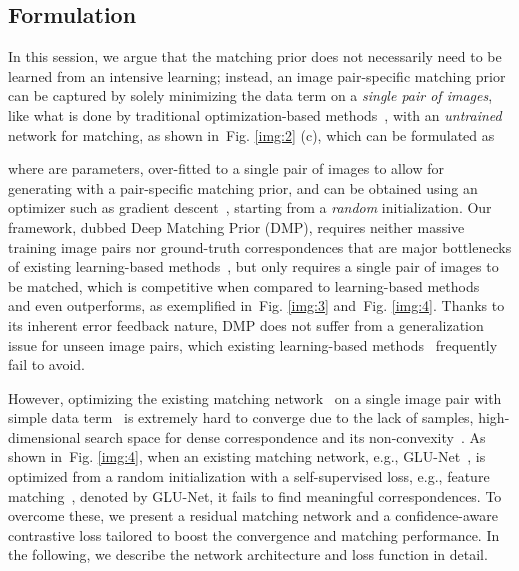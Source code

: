 \documentclass[10pt,twocolumn,letterpaper]{article}
\newcommand{\figref}[1]{Fig. \ref{#1}}
\begin{document}
\subsection{Formulation}\label{sec:3_2}
In this session, we argue that the matching prior does not necessarily need to be learned from an intensive learning; instead, an image pair-specific matching prior can be captured by solely minimizing the data term on a \emph{single pair of images}, like what is done by traditional optimization-based methods~\cite{liu2010sift,kim2017dctm}, with an \emph{untrained} network for matching, as shown in~\figref{img:2} (c), which can be formulated as 

where  are parameters, over-fitted to a single pair of images to allow for generating  with a pair-specific matching prior, and can be obtained using an optimizer such as gradient descent~\cite{kingma2014adam}, starting from a \emph{random} initialization. Our framework, dubbed Deep Matching Prior (DMP), requires neither massive training image pairs nor ground-truth correspondences that are major bottlenecks of existing learning-based methods~\cite{melekhov2019dgc,truong2020glu,shen2020ransac}, but only requires a single pair of images to be matched, which is competitive when compared to learning-based methods~\cite{melekhov2019dgc,kim2019semantic,truong2020glu,shen2020ransac} and even outperforms, as exemplified in~\figref{img:3} and~\figref{img:4}. Thanks to its inherent error feedback nature, DMP does not suffer from a generalization issue for unseen image pairs, which existing learning-based methods~\cite{melekhov2019dgc,kim2019semantic,truong2020glu,shen2020ransac} frequently fail to avoid.

However, optimizing the existing matching network~\cite{melekhov2019dgc,truong2020glu,shen2020ransac} on a single image pair with simple data term~\cite{liu2010sift,kim2017dctm} is extremely hard to converge due to the lack of samples, high-dimensional search space for dense correspondence and its non-convexity~\cite{kim2017dctm}. 
As shown in~\figref{img:4}, when an existing matching network, e.g., GLU-Net~\cite{yang2019volumetric}, is optimized from a random initialization with a self-supervised loss, e.g., feature matching~\cite{shen2020ransac}, denoted by GLU-Net, it fails to find meaningful correspondences. 
To overcome these, we present a residual matching network and a confidence-aware contrastive loss tailored to boost the convergence and matching performance. In the following, we describe the network architecture and loss function in detail.
\end{document}
